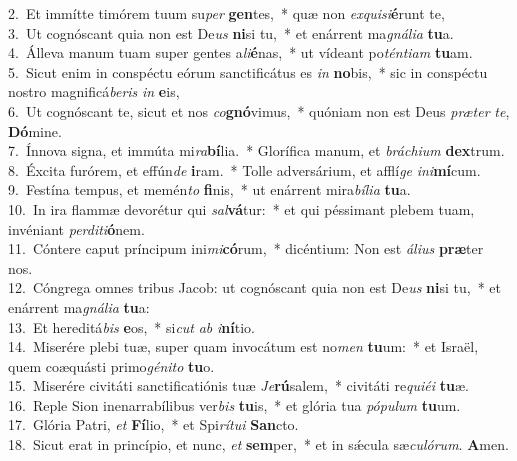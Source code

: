 {2.~}Et immítte timórem tuum su\textit{per} \textbf{gen}tes,~* quæ non \textit{ex}\textit{qui}\textit{si}\textbf{é}runt te,\\
{3.~}Ut cognóscant quia non est De\textit{us} \textbf{ni}si tu,~* et enárrent ma\textit{gná}\textit{li}\textit{a} \textbf{tu}a.\\
{4.~}Álleva manum tuam super gentes a\textit{li}\textbf{é}nas,~* ut vídeant po\textit{tén}\textit{ti}\textit{am} \textbf{tu}am.\\
{5.~}Sicut enim in conspéctu eórum sanctificátus es \textit{in} \textbf{no}bis,~* sic in conspéctu nostro magnificá\textit{be}\textit{ris} \textit{in} \textbf{e}is,\\
{6.~}Ut cognóscant te, sicut et nos \textit{co}\textbf{gnó}vimus,~* quóniam non est Deus \textit{præ}\textit{ter} \textit{te}, \textbf{Dó}mine.\\
{7.~}Ínnova signa, et immúta mi\textit{ra}\textbf{bí}lia.~* Glorífica manum, et \textit{brá}\textit{chi}\textit{um} \textbf{dex}trum.\\
{8.~}Éxcita furórem, et effún\textit{de} \textbf{i}ram.~* Tolle adversárium, et afflí\textit{ge} \textit{i}\textit{ni}\textbf{mí}cum.\\
{9.~}Festína tempus, et memén\textit{to} \textbf{fi}nis,~* ut enárrent mira\textit{bí}\textit{li}\textit{a} \textbf{tu}a.\\
{10.~}In ira flammæ devorétur qui \textit{sal}\textbf{vá}tur:~* et qui péssimant plebem tuam, invéniant \textit{per}\textit{di}\textit{ti}\textbf{ó}nem.\\
{11.~}Cóntere caput príncipum ini\textit{mi}\textbf{có}rum,~* dicéntium: Non est \textit{á}\textit{li}\textit{us} \textbf{præ}ter nos.\\
{12.~}Cóngrega omnes tribus Jacob: ut cognóscant quia non est De\textit{us} \textbf{ni}si tu,~* et enárrent ma\textit{gná}\textit{li}\textit{a} \textbf{tu}a:\\
{13.~}Et hereditá\textit{bis} \textbf{e}os,~* si\textit{cut} \textit{ab} \textit{i}\textbf{ní}tio.\\
{14.~}Miserére plebi tuæ, super quam invocátum est no\textit{men} \textbf{tu}um:~* et Israël, quem coæquásti primo\textit{gé}\textit{ni}\textit{to} \textbf{tu}o.\\
{15.~}Miserére civitáti sanctificatiónis tuæ \textit{Je}\textbf{rú}salem,~* civitáti re\textit{qui}\textit{é}\textit{i} \textbf{tu}æ.\\
{16.~}Reple Sion inenarrabílibus ver\textit{bis} \textbf{tu}is,~* et glória tua \textit{pó}\textit{pu}\textit{lum} \textbf{tu}um.\\
{17.~}Glória Patri, \textit{et} \textbf{Fí}lio,~* et Spi\textit{rí}\textit{tu}\textit{i} \textbf{San}cto.\\
{18.~}Sicut erat in princípio, et nunc, \textit{et} \textbf{sem}per,~* et in sǽcula sæ\textit{cu}\textit{ló}\textit{rum}. \textbf{A}men.\\
